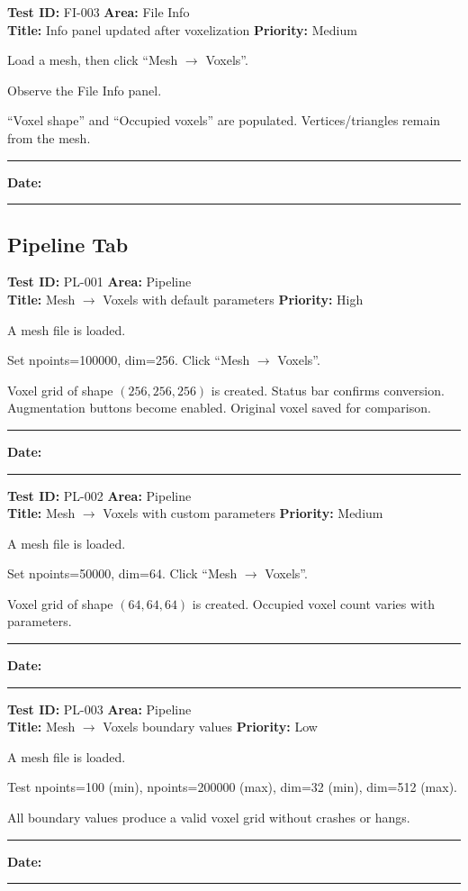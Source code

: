 \documentclass[12pt,a4paper]{article}
\newenvironment{testcase}[4]{%
  \smallskip
  \noindent\textbf{Test ID:} #1 \hfill \textbf{Area:} #2 \\
  \textbf{Title:} #3 \hfill \textbf{Priority:} #4
  \begin{description}[leftmargin=2em,style=nextline]
    \item[\textbf{Preconditions:}]
}{%
    \item[\textbf{Steps:}]
    \item[\textbf{Expected Result:}]
    \item[\textbf{Status:}] \rule{3cm}{0.4pt} \hspace{1em} \textbf{Date:} \rule{3cm}{0.4pt}
    \item[\textbf{Notes:}]
  \end{description}
  \smallskip
}
\begin{document}
\begin{testcase}{FI-003}{File Info}{Info panel updated after voxelization}{Medium}
  \item Load a mesh, then click ``Mesh $\rightarrow$ Voxels''.
  \item Observe the File Info panel.
  \item ``Voxel shape'' and ``Occupied voxels'' are populated. Vertices/triangles remain from the mesh.
\end{testcase}

\subsection{Pipeline Tab}

\begin{testcase}{PL-001}{Pipeline}{Mesh $\rightarrow$ Voxels with default parameters}{High}
  \item A mesh file is loaded.
  \item Set npoints=100000, dim=256. Click ``Mesh $\rightarrow$ Voxels''.
  \item Voxel grid of shape $(256,256,256)$ is created. Status bar confirms conversion. Augmentation buttons become enabled. Original voxel saved for comparison.
\end{testcase}

\begin{testcase}{PL-002}{Pipeline}{Mesh $\rightarrow$ Voxels with custom parameters}{Medium}
  \item A mesh file is loaded.
  \item Set npoints=50000, dim=64. Click ``Mesh $\rightarrow$ Voxels''.
  \item Voxel grid of shape $(64,64,64)$ is created. Occupied voxel count varies with parameters.
\end{testcase}

\begin{testcase}{PL-003}{Pipeline}{Mesh $\rightarrow$ Voxels boundary values}{Low}
  \item A mesh file is loaded.
  \item Test npoints=100 (min), npoints=200000 (max), dim=32 (min), dim=512 (max).
  \item All boundary values produce a valid voxel grid without crashes or hangs.
\end{testcase}
\end{document}
